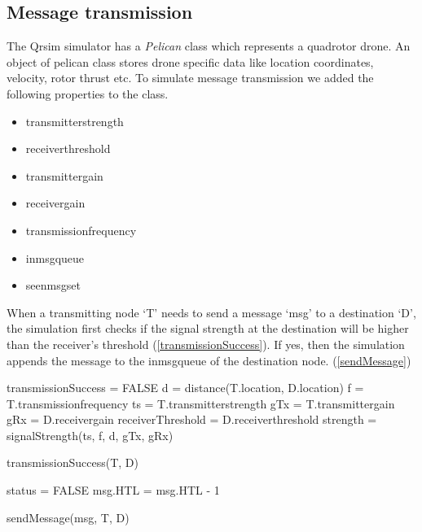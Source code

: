 \subsection{Message transmission}

The Qrsim simulator has a \emph{Pelican} class which represents a quadrotor drone. An object of pelican class stores drone specific data like location coordinates, velocity, rotor thrust etc. To simulate message transmission we added the following properties to the class.
\begin{itemize}
\item transmitter\textunderscore strength
\item receiver\textunderscore threshold
\item transmitter\textunderscore gain
\item receiver\textunderscore gain
\item transmission\textunderscore frequency
\item in\textunderscore msg\textunderscore queue
\item seen\textunderscore msg\textunderscore set
\end{itemize}

When a transmitting node `T' needs to send a message `msg' to a destination `D', the simulation first checks if the signal strength at the destination will be higher than the receiver's threshold (\ref{transmissionSuccess}). If yes, then the simulation appends the message to the in\textunderscore msg\textunderscore queue of the destination node. (\ref{sendMessage})

\begin{algorithm}[H]
\SetAlgoLined
\DontPrintSemicolon
{}
transmissionSuccess = FALSE\;
d = distance(T.location, D.location)\;
f = T.transmission\textunderscore frequency\;
ts = T.transmitter\textunderscore strength\;
gTx = T.transmitter\textunderscore gain\;
gRx = D.receiver\textunderscore gain\;
receiverThreshold = D.receiver\textunderscore threshold\;
strength = signalStrength(ts, f, d, gTx, gRx)\;

\caption{transmissionSuccess(T, D)} \label{transmissionSuccess}
\end{algorithm}

\begin{algorithm}[H]
\SetAlgoLined
{}
\DontPrintSemicolon
status = FALSE\;
msg.HTL = msg.HTL - 1\;

\caption{sendMessage(msg, T, D)} \label{sendMessage}
\end{algorithm}


